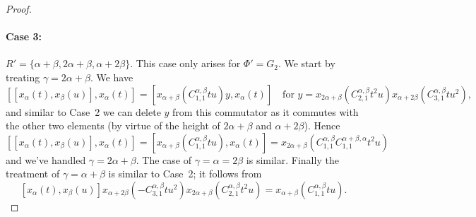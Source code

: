 \documentclass[10pt,a4paper]{article}
\theoremstyle{definition}
\begin{document}
\begin{proof}
    \paragraph{Case 3:} $R' = \{\alpha+\beta, 2\alpha+\beta, \alpha+2\beta\}$. This case only arises for $\Phi' = G_2$. We start by treating $\gamma = 2\alpha+\beta$.  We have 
    \[
        [[x_\alpha(t),x_\beta(u)],x_\alpha(t)] = [x_{\alpha+\beta}(C_{1,1}^{\alpha,\beta}tu) y, x_\alpha(t)] \quad \text{for } y = x_{2\alpha+\beta}(C_{2,1}^{\alpha,\beta}t^2u)x_{\alpha+2\beta}(C_{3,1}^{\alpha,\beta}tu^2),
    \]
    and similar to Case~2 we can delete $y$ from this commutator as it commutes with the other two elements (by virtue of the height of $2\alpha+\beta$ and $\alpha + 2\beta$).  Hence
    \[
        [[x_\alpha(t),x_\beta(u)],x_\alpha(t)] =  [x_{\alpha+\beta}(C_{1,1}^{\alpha,\beta}tu), x_\alpha(t)] = x_{2\alpha+\beta}(C_{1,1}^{\alpha,\beta}C_{1,1}^{\alpha+\beta,\alpha}t^2u)
    \]
    and we've handled $\gamma = 2\alpha + \beta$. The case of $\gamma = \alpha = 2\beta$ is similar.  Finally the treatment of  $\gamma = \alpha + \beta$ is similar to Case~2; it follows from
    \[[x_\alpha(t),x_\beta(u)]x_{\alpha+2\beta}(-C_{3,1}^{\alpha,\beta}tu^2)x_{2\alpha+\beta}(C_{2,1}^{\alpha,\beta}t^2u) = x_{\alpha+\beta}(C_{1,1}^{\alpha,\beta}tu).\]


\end{proof}
\end{document}
